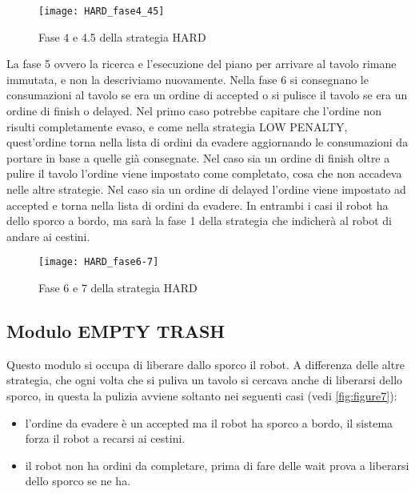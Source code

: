 \begin{figure}[h!tp]
  \centering
  \texttt{[image: HARD\_fase4\_45]}
  \caption{Fase 4 e 4.5 della strategia HARD}
  \label{fig:figure9}
\end{figure}

La fase 5 ovvero la ricerca e l'esecuzione del piano per arrivare al tavolo rimane immutata, e non la descriviamo nuovamente. Nella fase 6 si consegnano le consumazioni al tavolo se era un ordine di accepted o si pulisce il tavolo se era un ordine di finish o delayed.
Nel primo caso potrebbe capitare che l'ordine non risulti completamente evaso, e come nella strategia LOW PENALTY, quest'ordine torna nella lista di ordini da evadere aggiornando le consumazioni da portare in base a quelle già consegnate.
Nel caso sia un ordine di finish oltre a pulire il tavolo l'ordine viene impostato come completato, cosa che non accadeva nelle altre strategie.
Nel caso sia un ordine di delayed l'ordine viene impostato ad accepted e torna nella lista di ordini da evadere. In entrambi i casi il robot ha dello sporco a bordo, ma sarà la fase 1 della strategia che indicherà al robot di andare ai cestini.

\begin{figure}[htp]
  \texttt{[image: HARD\_fase6-7]}
  \caption{Fase 6 e 7 della strategia HARD}
  \label{fig:figure10}
\end{figure}

\subsection{Modulo EMPTY TRASH}
Questo modulo si occupa di liberare dallo sporco il robot. A differenza delle altre strategia, che ogni volta che si puliva un tavolo si cercava anche di liberarsi dello sporco, in questa la pulizia avviene soltanto nei seguenti casi (vedi \ref{fig:figure7}):
\begin{itemize}
  \item l'ordine da evadere è un accepted ma il robot ha sporco a bordo, il sistema forza il robot a recarsi ai cestini.
  \item il robot non ha ordini da completare, prima di fare delle wait prova a liberarsi dello sporco se ne ha.
\end{itemize}

